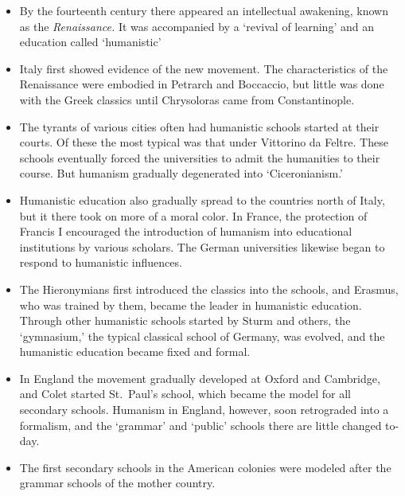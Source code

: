 \documentclass[
]{book}
\providecommand{\tightlist}{%
  \setlength{\itemsep}{0pt}\setlength{\parskip}{0pt}}
\begin{document}
\begin{itemize}
\tightlist
\item
  By the fourteenth century there appeared an intellectual awakening, known as the \emph{Renaissance.} It was accompanied by a `revival of learning' and an education called `humanistic'
\item
  Italy first showed evidence of the new movement. The characteristics of the Renaissance were embodied in Petrarch and Boccaccio, but little was done with the Greek classics until Chrysoloras came from Constantinople.
\item
  The tyrants of various cities often had humanistic schools started at their courts. Of these the most typical was that under Vittorino da Feltre. These schools eventually forced the universities to admit the humanities to their course. But humanism gradually degenerated into `Ciceronianism.'
\item
  Humanistic education also gradually spread to the countries north of Italy, but it there took on more of a moral color. In France, the protection of Francis I encouraged the introduction of humanism into educational institutions by various scholars. The German universities likewise began to respond to humanistic influences.
\item
  The Hieronymians first introduced the classics into the schools, and Erasmus, who was trained by them, became the leader in humanistic education. Through other humanistic schools started by Sturm and others, the `gymnasium,' the typical classical school of Germany, was evolved, and the humanistic education became fixed and formal.
\item
  In England the movement gradually developed at Oxford and Cambridge, and Colet started St.~Paul's school, which became the model for all secondary schools. Humanism in England, however, soon retrograded into a formalism, and the `grammar' and `public' schools there are little changed to-day.
\item
  The first secondary schools in the American colonies were modeled after the grammar schools of the mother country.
\end{itemize}
\end{document}
